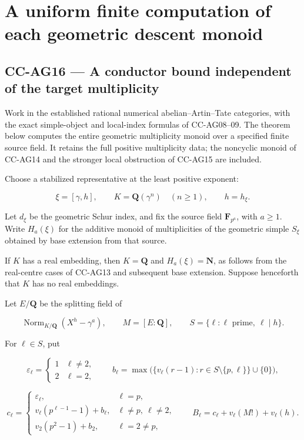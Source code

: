 \section{A uniform finite computation of each geometric descent
monoid}\label{a-uniform-finite-computation-of-each-geometric-descent-monoid}

\subsection{CC-AG16 --- A conductor bound independent of the target
multiplicity}\label{cc-ag16-a-conductor-bound-independent-of-the-target-multiplicity}

Work in the established rational numerical abelian--Artin--Tate
categories, with the exact simple-object and local-index formulas of
CC-AG08--09. The theorem below computes the entire geometric
multiplicity monoid over a specified finite source field. It retains the
full positive multiplicity data; the noncyclic monoid of CC-AG14 and the
stronger local obstruction of CC-AG15 are included.

Choose a stabilized representative at the least positive exponent:

\[
 \xi=[\gamma,h],\qquad
 K=\mathbf Q(\gamma^n)\quad(n\ge1),\qquad h=h_\xi.
 \tag{CC-AG.148}
\]

Let \(d_\xi\) be the geometric Schur index, and fix the source field
\(\mathbf F_{p^a}\), with \(a\ge1\). Write \(H_a(\xi)\) for the additive
monoid of multiplicities of the geometric simple \(S_\xi\) obtained by
base extension from that source.

If \(K\) has a real embedding, then \(K=\mathbf Q\) and
\(H_a(\xi)=\mathbf N\), as follows from the real-centre cases of CC-AG13
and subsequent base extension. Suppose henceforth that \(K\) has no real
embeddings.

Let \(E/\mathbf Q\) be the splitting field of

\[
 \operatorname{Norm}_{K/\mathbf Q}(X^h-\gamma^a),
 \qquad M=[E:\mathbf Q],\qquad S=\{\ell:\ell\text{ prime},\ \ell\mid h\}.
 \tag{CC-AG.149}
\]

For \(\ell\in S\), put

\[
 \varepsilon_\ell=
 \begin{cases}1&\ell\ne2,\\2&\ell=2,\end{cases}
 \qquad
 b_\ell=\max\bigl(\{v_\ell(r-1):r\in S\setminus\{p,\ell\}\}\cup\{0\}\bigr),
 \tag{CC-AG.150}
\]

\[
 c_\ell=
 \begin{cases}
 \varepsilon_\ell,&\ell=p,\\
 v_\ell(p^{\ell-1}-1)+b_\ell,&\ell\ne p,\ \ell\ne2,\\
 v_2(p^2-1)+b_2,&\ell=2\ne p,
 \end{cases}
 \qquad
 B_\ell=c_\ell+v_\ell(M!)+v_\ell(h).
 \tag{CC-AG.151}
\]

